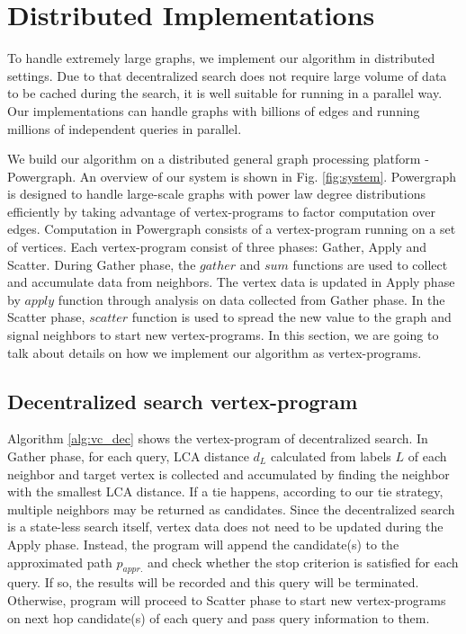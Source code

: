 \section{Distributed Implementations}
\label{implementation}

To handle extremely large graphs, we implement our algorithm in distributed settings. Due to that decentralized search does not require large volume of data to be cached during the search, it is well suitable for running in a parallel way. Our implementations can handle graphs with billions of edges and running millions of independent queries in parallel.

We build our algorithm on a distributed general graph processing platform - Powergraph\cite{180251}. An overview of our system is shown in Fig. \ref{fig:system}. Powergraph is designed to handle large-scale graphs with power law degree distributions efficiently by taking advantage of vertex-programs to factor computation over edges. Computation in Powergraph consists of a vertex-program running on a set of vertices. Each vertex-program consist of three phases: Gather, Apply and Scatter. During Gather phase, the $gather$ and $sum$ functions are used to collect and accumulate data from neighbors. The vertex data is updated in Apply phase by $apply$ function through analysis on data collected from Gather phase. In the Scatter phase, $scatter$ function is used to spread the new value to the graph and signal neighbors to start new vertex-programs. In this section, we are going to talk about details on how we implement our algorithm as vertex-programs.

\subsection{Decentralized search vertex-program}

Algorithm \ref{alg:vc_dec} shows the vertex-program of decentralized search. In Gather phase, for each query, LCA distance $d_L$ calculated from labels $L$ of each neighbor and target vertex is collected and accumulated by finding the neighbor with the smallest LCA distance. If a tie happens, according to our tie strategy, multiple neighbors may be returned as candidates. Since the decentralized search is a state-less search itself, vertex data does not need to be updated during the Apply phase. Instead, the program will append the candidate(s) to the approximated path $p_{appr.}$ and check whether the stop criterion is satisfied for each query. If so, the results will be recorded and this query will be terminated. Otherwise, program will proceed to Scatter phase to start new vertex-programs on next hop candidate(s) of each query and pass query information to them.

